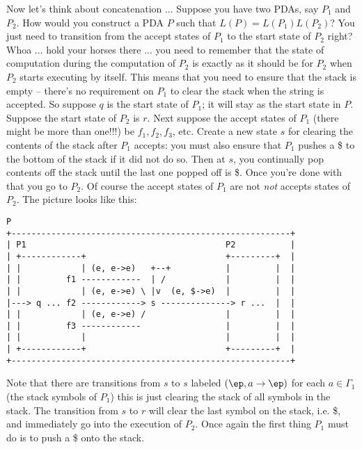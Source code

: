 \newpage
\begin{eg}
Now let's think about concatenation ...
Suppose you have two PDAs, say $P_1$ and $P_2$.
How would you construct a PDA $P$ such that $L(P) = L(P_1)L(P_2)$?
You just need to transition from the accept states of $P_1$
to the start state of $P_2$ right?
Whoa ... hold your horses there ... you need to remember that 
the state of computation during the computation of $P_2$
is exactly as it should be for $P_2$
when $P_2$ starts executing by itself.
This means that you need to ensure that the stack is empty -- 
there's no requirement on $P_1$ to clear the stack when the string is accepted.
So suppose $q$ is the start state of $P_1$; it will stay as the start
state in $P$.
Suppose the start state of $P_2$ is $r$.
Next suppose the accept states of $P_1$ (there might be more than one!!!)
be $f_1, f_2, f_3$, etc.
Create a new state $s$ for clearing the contents of the stack after $P_1$
accepts:
you must also ensure that $P_1$ pushes a \$ to the bottom of the stack if it 
did not do so.
Then at $s$, you continually pop contents off the stack until the last one 
popped off is \$.
Once you're done with that you go to $P_2$.
Of course the accept states of $P_1$ are not \textit{ not} accepts states of $P_2$.
The picture looks like this:
\begin{verbatim}
P
+--------------------------------------------------------+
| P1                                        P2           |
| +------------+                            +---------+  |
| |            | (e, e->e)   +--+           |         |  |
| |         f1 ------------  | /            |         |  |
| |            | (e, e->e) \ |v  (e, $->e)  |         |  |
|---> q ... f2 ------------> s --------------> r ...  |  |
| |            | (e, e->e) /                |         |  |
| |         f3 ------------                 |         |  |
| |            |                            |         |  |
| +------------+                            +---------+  |
+--------------------------------------------------------+
\end{verbatim}
Note that there are transitions from $s$ to $s$ labeled 
$(\ep, a \rightarrow \ep)$ for each $a \in \Gamma_1$ (the stack symbols of 
$P_1$)
this is just clearing the stack of all symbols in the stack.
The transition from $s$ to $r$ will clear the last symbol on the stack, i.e.
\$, and immediately go into the execution of $P_2$.
Once again the first thing $P_1$ must do is to push a \$ onto the stack. 
\end{eg}




